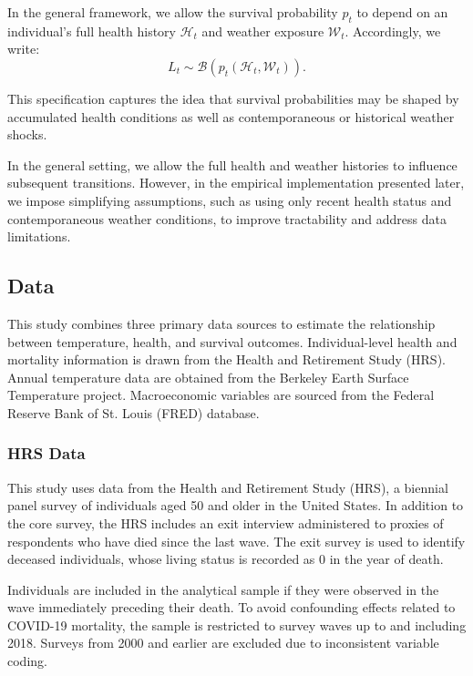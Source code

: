 \documentclass{article}
\begin{document}
In the general framework, we allow the survival probability $p_t$ to depend on an individual's full health history $\mathcal{H}_t$ and weather exposure $\mathcal{W}_t$. Accordingly, we write:
\[
L_t \sim \mathcal{B}(p_t(\mathcal{H}_t, \mathcal{W}_t)).
\]

This specification captures the idea that survival probabilities may be shaped by accumulated health conditions as well as contemporaneous or historical weather shocks.

In the general setting, we allow the full health and weather histories to influence subsequent transitions.
However, in the empirical implementation presented later, we impose simplifying assumptions, such as using only recent health status and contemporaneous weather conditions, 
to improve tractability and address data limitations.

\subsection{Data}\label{data}

This study combines three primary data sources to estimate the
relationship between temperature, health, and survival outcomes.
Individual-level health and mortality information is drawn from
the Health and Retirement Study (HRS).
Annual temperature data are obtained from the Berkeley Earth Surface Temperature project.
Macroeconomic variables are sourced from the Federal Reserve Bank of St. Louis (FRED) database.

\subsubsection{HRS Data}
This study uses data from the Health and Retirement Study (HRS), a biennial panel survey of individuals aged 50 and older in the United States. In addition to the core survey, the HRS includes an exit interview administered to proxies of respondents who have died since the last wave. The exit survey is used to identify deceased individuals, whose living status is recorded as 0 in the year of death.

Individuals are included in the analytical sample if they were observed in the wave immediately preceding their death. To avoid confounding effects related to COVID-19 mortality, the sample is restricted to survey waves up to and including 2018. Surveys from 2000 and earlier are excluded due to inconsistent variable coding.
\\
\end{document}
